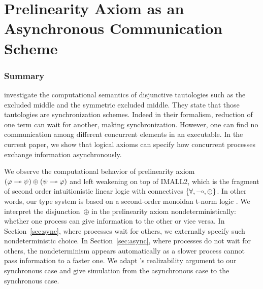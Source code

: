\chapter{Prelinearity Axiom as an Asynchronous Communication Scheme}




% 



\subsection{Summary}
\citet{danos-krivine} investigate
the computational semantics of disjunctive tautologies
such as the excluded middle and the symmetric excluded middle.
They state that those tautologies are synchronization schemes.
Indeed in their formalism, reduction of one term can wait
for another, making synchronization.
However,
one can find no communication among different
concurrent elements in an executable.
In the current paper, we show that logical axioms can specify how
concurrent processes exchange information asynchronously.

We observe the computational behavior of prelinearity axiom
$(\varphi\multimap\psi)\oplus(\psi\multimap\varphi)$ and left weakening
on top of IMALL2, which is the fragment of second order
intuitionistic linear logic with connectives $\{\forall, \multimap,
\oplus\}$.  In other words, our type system is based on a second-order
monoidan t-norm logic .
We interpret the disjunction~$\oplus$ in the prelinearity axiom
nondeterministically: whether
one process can give information to the other or
vice versa.
In Section~\ref{sec:sync}, where processes wait for others,
we externally specify such nondeterministic choice.
In Section~\ref{sec:async}, where processes do not wait for others,
the nondeterminism appears automatically as a slower process cannot pass
information to a faster one.
We adapt \citet{danos-krivine}'s realizability argument to our
synchronous case and give simulation from the
asynchronous case to the synchronous case.

